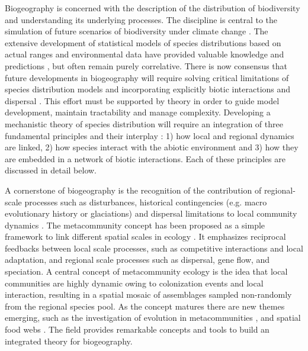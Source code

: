 Biogeography is concerned with the description of the distribution of biodiversity and understanding its underlying processes. The discipline is central to the simulation of future scenarios of biodiversity under climate change \citep{Thuiller2013}. The extensive development of statistical models of species distributions based on actual ranges and environmental data have provided valuable knowledge and predictions \citep{Kearney2004}, but often remain purely correlative. There is now consensus that future developments in biogeography will require solving critical limitations of species distribution models \citep{Kissling2012} and incorporating explicitly biotic interactions and dispersal \citep{Lavergne2010}. This effort must be supported by theory in order to guide model development, maintain tractability and manage complexity. Developing a mechanistic theory of species distribution will require an integration of three fundamental principles and their interplay \citep{Thuiller2013}: 1) how local and regional dynamics are linked, 2) how species interact with the abiotic environment and 3) how they are embedded in a network of biotic interactions. Each of these principles are discussed in detail below.

A cornerstone of biogeography is the recognition of the contribution of regional-scale processes such as disturbances, historical contingencies (e.g. macro evolutionary history or glaciations) and dispersal limitations to local community dynamics \citep{Ricklefs1987}. The metacommunity concept has been proposed as a simple framework to link different spatial scales in ecology \citep{Leibold2004}. It emphasizes reciprocal feedbacks between local scale processes, such as competitive interactions and local adaptation, and regional scale processes such as dispersal, gene flow, and speciation. A central concept of metacommunity ecology is the idea that local communities are highly dynamic owing to colonization events and local interaction, resulting in a spatial mosaic of assemblages sampled non-randomly from the regional species pool. As the concept matures there are new themes emerging, such as the investigation of evolution in metacommunities \citep{Urban2008}, and spatial food webs \citep{Massol2011,Gravel2011}. The field provides remarkable concepts and tools to build an integrated theory for biogeography.

